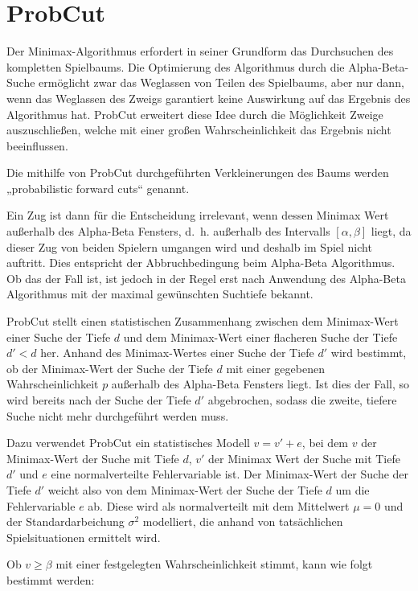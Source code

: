 \section{ProbCut}
\label{sec:probcut}

Der Minimax-Algorithmus erfordert in seiner Grundform das Durchsuchen des kompletten Spielbaums. Die Optimierung des
Algorithmus durch die Alpha-Beta-Suche ermöglicht zwar das Weglassen von Teilen des Spielbaums, aber nur dann, wenn das
Weglassen des Zweigs garantiert keine Auswirkung auf das Ergebnis des Algorithmus hat. ProbCut erweitert diese Idee
durch die Möglichkeit Zweige auszuschließen, welche mit einer großen Wahrscheinlichkeit das Ergebnis nicht beeinflussen.

Die mithilfe von ProbCut durchgeführten Verkleinerungen des Baums werden „probabilistic forward cuts“ genannt.

Ein Zug ist dann für die Entscheidung irrelevant, wenn dessen Minimax Wert außerhalb des Alpha-Beta Fensters, d. h.
außerhalb des Intervalls \([\alpha,\beta]\) liegt, da dieser Zug von beiden Spielern umgangen wird und deshalb im Spiel
nicht auftritt. Dies entspricht der Abbruchbedingung beim Alpha-Beta Algorithmus. Ob das der Fall ist, ist jedoch in der
Regel erst nach Anwendung des Alpha-Beta Algorithmus mit der maximal gewünschten Suchtiefe bekannt.

ProbCut stellt einen statistischen Zusammenhang zwischen dem Minimax-Wert einer Suche der Tiefe \(d\) und dem
Minimax-Wert einer flacheren Suche der Tiefe \(d'<d\) her. Anhand des Minimax-Wertes einer Suche der Tiefe \(d'\) wird
bestimmt, ob der Minimax-Wert der Suche der Tiefe \(d\) mit einer gegebenen Wahrscheinlichkeit \(p\) außerhalb des
Alpha-Beta Fensters liegt. Ist dies der Fall, so wird bereits nach der Suche der Tiefe \(d'\) abgebrochen, sodass die
zweite, tiefere Suche nicht mehr durchgeführt werden muss.

Dazu verwendet ProbCut ein statistisches Modell \(v=v'+e\), bei dem \(v\) der Minimax-Wert der Suche mit Tiefe \(d\),
\(v'\) der Minimax Wert der Suche mit Tiefe \(d'\) und \(e\) eine normalverteilte Fehlervariable ist. Der Minimax-Wert
der Suche der Tiefe \(d'\) weicht also von dem Minimax-Wert der Suche der Tiefe \(d\) um die Fehlervariable \(e\) ab.
Diese wird als normalverteilt mit dem Mittelwert $\mu=0$ und der Standardarbeichung \(\sigma^2\) modelliert, die anhand
von tatsächlichen Spielsituationen ermittelt wird.

Ob $v\geq\beta$ mit einer festgelegten Wahrscheinlichkeit stimmt, kann wie folgt bestimmt werden:

